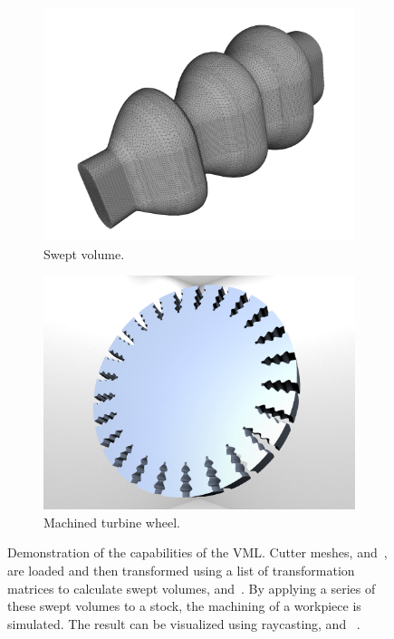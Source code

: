 \begin{figure}[h]
\begin{subfigure}[t]{0.32\textwidth}
			\includegraphics[width=\textwidth]{images/turbine_swept}
			\caption{Swept volume.}
			\label{fig:turbine_swept}
		\end{subfigure}
		\begin{subfigure}[t]{0.32\textwidth}
			\centering
			\includegraphics[width=\textwidth]{images/turbine_complete}
			\caption{Machined turbine wheel.}
			\label{fig:turbine_complete}
		\end{subfigure}
	\caption[VML demo]{
		Demonstration of the capabilities of the VML.
		Cutter meshes, \cf {} and~, are loaded and then transformed using a list of transformation matrices to calculate swept volumes, \cf {} and~.
		By applying a series of these swept volumes to a stock, the machining of a workpiece is simulated.
		The result can be visualized using raycasting, \cf {} and~ \cite{engrave_report}.
	}
	\label{fig:vml_demo}
\end{figure}


